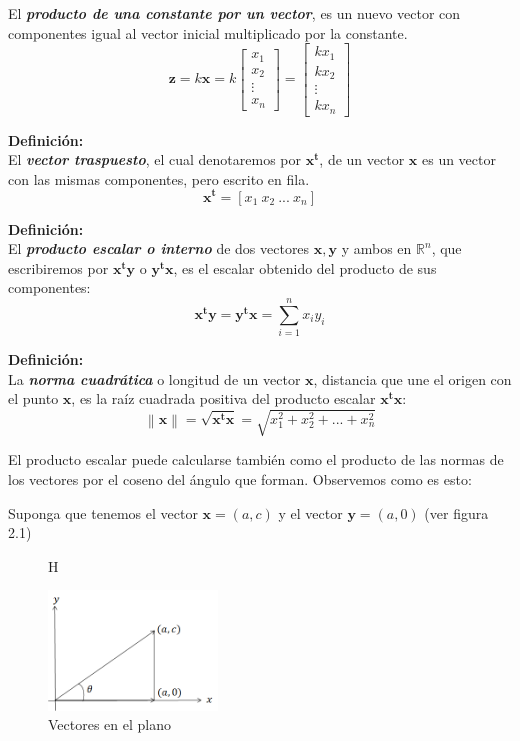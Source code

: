 \documentclass[12pt,letterpaper]{report} %
\begin{document}
El \textit{\textbf{producto de una constante por un vector}}, es un nuevo vector con componentes igual al vector inicial multiplicado por la constante.
$$\mathbf{z}=k\mathbf{x}=k \begin{bmatrix} x_1\\ x_2 \\ \vdots \\ x_n\end{bmatrix} =\begin{bmatrix} kx_1\\ kx_2 \\ \vdots \\ kx_n\end{bmatrix}$$

\textbf{Definición:} \\

El \textit{\textbf{vector traspuesto}}, el cual denotaremos por $\mathbf{x^t}$, de un vector $\mathbf{x}$ es un vector con las mismas componentes, pero escrito en fila.
$$\mathbf{x^t}=[ x_1 \  x_2 \ ... \ x_n]$$

\textbf{Definición:} \\

El \textit{\textbf{producto escalar o interno}} de dos vectores $\mathbf{x},\mathbf{y}$ y ambos en $\mathbb{R}^n$, que escribiremos por $\mathbf{x^ty}$ o $\mathbf{y^tx}$, es el escalar obtenido del producto de sus componentes:
$$\mathbf{x^ty}=\mathbf{y^tx}=\displaystyle\sum_{i=1}^n x_i y_i$$

\textbf{Definición:} \\

La \textit{\textbf{norma cuadrática}} o longitud de un vector $\mathbf{x}$, distancia que une el origen con el punto $\mathbf{x}$, es la raíz cuadrada positiva del producto escalar $\mathbf{x^tx}$:
$$\left\| \mathbf{x} \right\|=\sqrt{\mathbf{x^tx}}=\sqrt{x_1^2+x_2^2+...+x_n^2}$$

El producto escalar puede calcularse también como el producto de las normas de los vectores por el coseno del ángulo que forman. Observemos como es esto:

Suponga que tenemos el vector $\mathbf{x}=(a,c)$ y el vector $\mathbf{y}=(a,0)$ (ver figura 2.1)\\

\begin{figure}{H}
	\caption{Vectores en el plano}
	\centering
	\includegraphics[width=0.4\textwidth]{img/producescal.png}
\end{figure}
\end{document}
